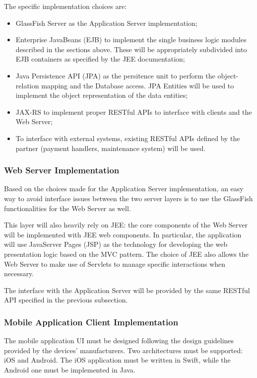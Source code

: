 The specific implementation choices are:
\begin{itemize}
\item GlassFish Server as the Application Server implementation;
\item Enterprise JavaBeans (EJB) to implement the single business logic modules described in the sections above. These will be appropriately subdivided into EJB containers as specified by the JEE documentation;
\item Java Persistence API (JPA) as the persitence unit to perform the object-relation mapping and the Database access. JPA Entities will be used to implement the object representation of the data entities;
\item JAX-RS to implement proper RESTful APIs to interface with clients and the Web Server;
\item To interface with external systems, existing RESTful APIs defined by the partner (payment handlers, maintenance system) will be used.
\end{itemize}


\subsubsection{Web Server Implementation}
Based on the choices made for the Application Server implementation, an easy way to avoid interface issues between the two server layers is to use the GlassFish functionalities for the Web Server as well.

This layer will also heavily rely on JEE: the core components of the Web Server will be implemented with JEE web components. In particular, the application will use JavaServer Pages (JSP) as the technology for developing the web presentation logic based on the MVC pattern. The choice of JEE also allows the Web Server to make use of Servlets to manage specific interactions when necessary.

The interface with the Application Server will be provided by the same RESTful API specified in the previous subsection.


\subsubsection{Mobile Application Client Implementation}
The mobile application UI must be designed following the design guidelines provided by the devices' manufacturers. Two architectures must be supported: iOS and Android. The iOS application must be written in Swift, while the Android one must be implemented in Java.

